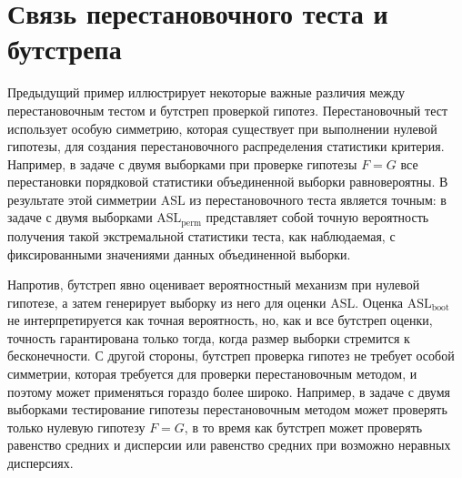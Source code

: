 \section{Связь перестановочного теста и бутстрепа}

Предыдущий пример иллюстрирует некоторые важные различия между перестановочным тестом и бутстреп проверкой гипотез. Перестановочный тест использует особую симметрию, которая существует при выполнении нулевой гипотезы, для создания перестановочного распределения статистики критерия. Например, в задаче с двумя выборками при проверке гипотезы $F = G$ все перестановки порядковой статистики объединенной выборки равновероятны. В результате этой симметрии $\text{ASL}$ из перестановочного теста является точным: в задаче с двумя выборками $\text{ASL}_{\text{perm}}$ представляет собой точную вероятность получения такой экстремальной статистики теста, как наблюдаемая, с фиксированными значениями данных объединенной выборки.

Напротив, бутстреп явно оценивает вероятностный механизм при нулевой гипотезе, а затем генерирует выборку из него для оценки $\text{ASL}$. Оценка $\text{ASL}_{\text{boot}}$ не интерпретируется как точная вероятность, но, как и все бутстреп оценки, точность гарантирована только тогда, когда размер выборки стремится к бесконечности. С другой стороны, бутстреп проверка гипотез не требует особой симметрии, которая требуется для проверки перестановочным методом, и поэтому может применяться гораздо более широко. Например, в задаче с двумя выборками тестирование гипотезы перестановочным методом может проверять только нулевую гипотезу $F = G$, в то время как бутстреп может проверять равенство средних и дисперсии или равенство средних при возможно неравных дисперсиях. 
